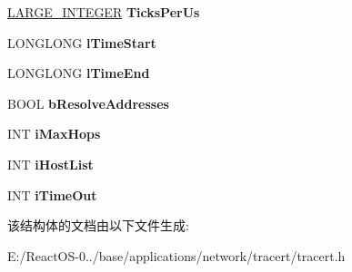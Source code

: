 \begin{DoxyCompactItemize}
\hyperlink{union___l_a_r_g_e___i_n_t_e_g_e_r}{L\+A\+R\+G\+E\+\_\+\+I\+N\+T\+E\+G\+ER} {\bfseries Ticks\+Per\+Us}
\item 
\mbox{\label{struct___a_p_p_i_n_f_o_ad778b009138ead0c205b6a59d19c4159}} 
L\+O\+N\+G\+L\+O\+NG {\bfseries l\+Time\+Start}
\item 
\mbox{\label{struct___a_p_p_i_n_f_o_a48aebd39bdd102cb9a430d95b850f5b0}} 
L\+O\+N\+G\+L\+O\+NG {\bfseries l\+Time\+End}
\item 
\mbox{\label{struct___a_p_p_i_n_f_o_a2e68fbc7b901bc00d74e98b05863f621}} 
B\+O\+OL {\bfseries b\+Resolve\+Addresses}
\item 
\mbox{\label{struct___a_p_p_i_n_f_o_a2aab83a22e4876e0575a2eeb318522d1}} 
I\+NT {\bfseries i\+Max\+Hops}
\item 
\mbox{\label{struct___a_p_p_i_n_f_o_a0df251eae5c1584f70e8cf5ed1bfc487}} 
I\+NT {\bfseries i\+Host\+List}
\item 
\mbox{\label{struct___a_p_p_i_n_f_o_a5e6d0d98cbcc65f9937d72d318f3e4c6}} 
I\+NT {\bfseries i\+Time\+Out}
\end{DoxyCompactItemize}


该结构体的文档由以下文件生成\+:\begin{DoxyCompactItemize}
\item 
E\+:/\+React\+O\+S-\/0../base/applications/network/tracert/tracert.\+h\end{DoxyCompactItemize}

